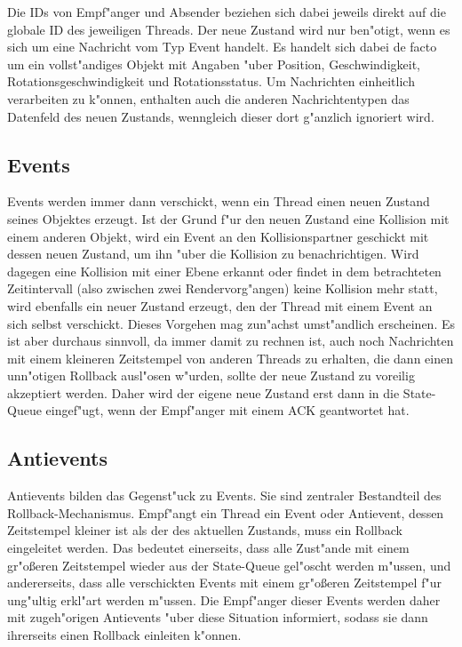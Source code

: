 \documentclass[a4paper, 10pt, openright, parskip, chapterprefix]{scrreprt}
\begin{document}
Die IDs von Empf"anger und Absender beziehen sich dabei jeweils direkt auf die globale ID des jeweiligen Threads. Der
neue Zustand wird nur ben"otigt, wenn es sich um eine Nachricht vom Typ Event handelt. Es handelt sich dabei de facto um
ein vollst"andiges Objekt mit Angaben "uber Position, Geschwindigkeit, Rotationsgeschwindigkeit und Rotationsstatus. Um
Nachrichten einheitlich verarbeiten zu k"onnen, enthalten auch die anderen Nachrichtentypen das Datenfeld des neuen
Zustands, wenngleich dieser dort g"anzlich ignoriert wird.

\subsection{Events}
Events werden immer dann verschickt, wenn ein Thread einen neuen Zustand seines Objektes erzeugt. Ist der Grund f"ur den
neuen Zustand eine Kollision mit einem anderen Objekt, wird ein Event an den Kollisionspartner geschickt mit dessen
neuen Zustand, um ihn "uber
die Kollision zu benachrichtigen. Wird dagegen eine Kollision mit einer Ebene erkannt oder findet in dem betrachteten
Zeitintervall (also zwischen zwei Rendervorg"angen) keine Kollision mehr statt, wird ebenfalls ein neuer Zustand
erzeugt, den der Thread mit einem Event an sich selbst verschickt. Dieses Vorgehen mag zun"achst umst"andlich erscheinen. Es ist aber
durchaus sinnvoll, da immer damit zu rechnen ist, auch noch Nachrichten mit einem kleineren Zeitstempel von anderen
Threads zu erhalten, die dann einen unn"otigen Rollback ausl"osen w"urden, sollte der neue Zustand zu voreilig akzeptiert
werden. Daher wird der eigene neue Zustand erst dann in die State-Queue eingef"ugt, wenn der Empf"anger mit einem ACK
geantwortet hat.

\subsection{Antievents}
Antievents bilden das Gegenst"uck zu Events. Sie sind zentraler Bestandteil des Rollback-Mechanismus. Empf"angt ein
Thread ein Event oder Antievent, dessen Zeitstempel kleiner ist als der des aktuellen Zustands, muss ein Rollback eingeleitet
werden. Das bedeutet einerseits, dass alle Zust"ande mit einem gr"o\ss eren Zeitstempel wieder aus der State-Queue gel"oscht werden m"ussen, und
andererseits, dass alle verschickten Events mit einem gr"o\ss eren Zeitstempel f"ur ung"ultig erkl"art werden m"ussen.
Die Empf"anger dieser Events werden daher mit
zugeh"origen Antievents "uber diese Situation informiert, sodass sie dann ihrerseits einen Rollback einleiten k"onnen.
\end{document}
